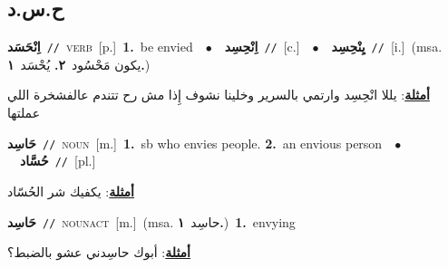 \documentclass[10pt,a4paper,twoside]{article} %
\begin{document}
\begin{multicols}{2}
\vspace{-3mm}
\subsection*{\color{blue}\foreignlanguage{arabic}{ح.س.د}\color{blue}{}} 

{\setlength\topsep{0pt}\textbf{\foreignlanguage{arabic}{اِنْحَسَد}}\ {\color{gray}\texttt{//}\color{black}}\ \textsc{verb}\ [p.]\ \textbf{1.}~be envied\ \ $\bullet$\ \ \setlength\topsep{0pt}\textbf{\foreignlanguage{arabic}{اِنْحِسِد}}\ {\color{gray}\texttt{//}\color{black}}\ [c.]\ \ $\bullet$\ \ \setlength\topsep{0pt}\textbf{\foreignlanguage{arabic}{يِنْحِسِد}}\ {\color{gray}\texttt{//}\color{black}}\ [i.]\ \color{gray}(msa. \foreignlanguage{arabic}{يكون مَحْسُود}~\foreignlanguage{arabic}{\textbf{٢.}}  \foreignlanguage{arabic}{يُحْسَد}~\foreignlanguage{arabic}{\textbf{١.}})\color{black}\  \begin{flushright}\color{gray}\foreignlanguage{arabic}{\textbf{\underline{\foreignlanguage{arabic}{أمثلة}}}: يللا انْحِسِد وارتمي بالسرير وخلينا نشوف إِذا مش رح تتندم عالفشخرة اللي عملتها}\end{flushright}\color{black}} \vspace{2mm}

{\setlength\topsep{0pt}\textbf{\foreignlanguage{arabic}{حَاسِد}}\ {\color{gray}\texttt{//}\color{black}}\ \textsc{noun}\ [m.]\ \textbf{1.}~sb who envies people.  \textbf{2.}~an envious person\ \ $\bullet$\ \ \setlength\topsep{0pt}\textbf{\foreignlanguage{arabic}{حُسَّاد}}\ {\color{gray}\texttt{//}\color{black}}\ [pl.]\  \begin{flushright}\color{gray}\foreignlanguage{arabic}{\textbf{\underline{\foreignlanguage{arabic}{أمثلة}}}: يكفيك شر الحُسّاد}\end{flushright}\color{black}} \vspace{2mm}

{\setlength\topsep{0pt}\textbf{\foreignlanguage{arabic}{حَاسِد}}\ {\color{gray}\texttt{//}\color{black}}\ \textsc{noun\textunderscore act}\ [m.]\ \color{gray}(msa. \foreignlanguage{arabic}{حاسِد}~\foreignlanguage{arabic}{\textbf{١.}})\color{black}\ \textbf{1.}~envying\  \begin{flushright}\color{gray}\foreignlanguage{arabic}{\textbf{\underline{\foreignlanguage{arabic}{أمثلة}}}: أبوك حاسِدني عشو بالضبط؟}\end{flushright}\color{black}} \vspace{2mm}


\end{multicols}
\end{document}
